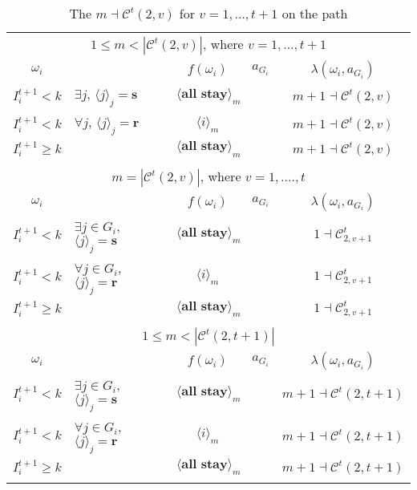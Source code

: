 \documentclass[12pt,letter]{article}
\newcommand{\Kappa}{\mathcal{C}}
\theoremstyle{definition}
\theoremstyle{remark}
\theoremstyle{claim}
\begin{document}
\begin{table}[!htbp]
\caption{The $m\dashv\Kappa^t(2,v)$ for $v=1,...,t+1$ on the path}
\label{table:eqm_path_kt2}
\begin{center}
\begin{tabular}{c l | c | c | c}
\multicolumn{5}{c}{$1\leq m < |\Kappa^t(2,v)|$, where $v=1,...,t+1$}\\
$\omega_i$ 	 & 	   &	$f(\omega_i)$  &	$a_{G_i}$ & $\lambda(\omega_i,a_{G_i})$ \\
\hline
\hline
$I^{t+1}_i< k$  	& 	$\exists j$, $\langle j \rangle_j=\textbf{s}$	& $\langle \textbf{all stay} \rangle_m$		&  	& $m+1\dashv \Kappa^t(2,v)$\\
$I^{t+1}_i< k$  	& 	$\forall j$, $\langle j \rangle_j=\textbf{r}$	& $\langle i \rangle_m$		&  	& $m+1\dashv \Kappa^t(2,v)$\\
$I^{t+1}_i\geq k$	 & 				& $\langle \textbf{all stay} \rangle_m$ 	& 		& $m+1\dashv \Kappa^t(2,v)$\\
\hline
\\
\multicolumn{5}{c}{$m= |\Kappa^t(2,v)|$, where $v=1,....,t$}\\
$\omega_i$ 	 & 	   &	$f(\omega_i)$  &	$a_{G_i}$ & $\lambda(\omega_i,a_{G_i})$ \\
\hline
\hline
$I^{t+1}_i< k$  	& 	$\exists j\in G_i$, $\langle j \rangle_j=\textbf{s}$	& $\langle \textbf{all stay} \rangle_m$		&  	& $1\dashv \Kappa^t_{2,v+1}$\\
$I^{t+1}_i< k$  	& 	$\forall j\in G_i$, $\langle j \rangle_j=\textbf{r}$	& $\langle i \rangle_m$		&  	& $1\dashv \Kappa^t_{2,v+1}$\\
$I^{t+1}_i\geq k$	 & 				& $\langle \textbf{all stay} \rangle_m$ 	& 		& $1\dashv \Kappa^t_{2,v+1}$\\
\hline
\\
\multicolumn{5}{c}{$1\leq m < |\Kappa^t(2,t+1)|$}\\
$\omega_i$ 	 & 	   &	$f(\omega_i)$  &	$a_{G_i}$ & $\lambda(\omega_i,a_{G_i})$ \\
\hline
\hline
$I^{t+1}_i< k$  	& 	$\exists j\in G_i$, $\langle j \rangle_j=\textbf{s}$	& $\langle \textbf{all stay} \rangle_m$		&  	& $m+1\dashv \Kappa^t(2,t+1)$\\
$I^{t+1}_i< k$  	& 	$\forall j\in G_i$, $\langle j \rangle_j=\textbf{r}$	& $\langle i \rangle_m$		&  	& $m+1\dashv \Kappa^t(2,t+1)$\\
$I^{t+1}_i\geq k$	 & 				& $\langle \textbf{all stay} \rangle_m$ 	& 		& $m+1\dashv \Kappa^t(2,t+1)$\\
\hline
\\

\end{tabular}
\end{center}
\end{table}
\end{document}
